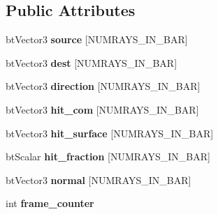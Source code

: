 \subsection*{Public Attributes}
\begin{DoxyCompactItemize}
\item 
\hypertarget{classbt_convexcast_batch_af49961c9228ece1ae5c6c7099a54441c}{bt\+Vector3 {\bfseries source} \mbox{[}N\+U\+M\+R\+A\+Y\+S\+\_\+\+I\+N\+\_\+\+B\+A\+R\mbox{]}}\label{classbt_convexcast_batch_af49961c9228ece1ae5c6c7099a54441c}

\item 
\hypertarget{classbt_convexcast_batch_a318654732e77f21596438f67617095ab}{bt\+Vector3 {\bfseries dest} \mbox{[}N\+U\+M\+R\+A\+Y\+S\+\_\+\+I\+N\+\_\+\+B\+A\+R\mbox{]}}\label{classbt_convexcast_batch_a318654732e77f21596438f67617095ab}

\item 
\hypertarget{classbt_convexcast_batch_a8bb4742eeca2f7eb9d22002be1f7f445}{bt\+Vector3 {\bfseries direction} \mbox{[}N\+U\+M\+R\+A\+Y\+S\+\_\+\+I\+N\+\_\+\+B\+A\+R\mbox{]}}\label{classbt_convexcast_batch_a8bb4742eeca2f7eb9d22002be1f7f445}

\item 
\hypertarget{classbt_convexcast_batch_abd524e5a612687deda8346b94b6d120a}{bt\+Vector3 {\bfseries hit\+\_\+com} \mbox{[}N\+U\+M\+R\+A\+Y\+S\+\_\+\+I\+N\+\_\+\+B\+A\+R\mbox{]}}\label{classbt_convexcast_batch_abd524e5a612687deda8346b94b6d120a}

\item 
\hypertarget{classbt_convexcast_batch_a0e78c6f2ccb9cf8f3f51a1791af815ec}{bt\+Vector3 {\bfseries hit\+\_\+surface} \mbox{[}N\+U\+M\+R\+A\+Y\+S\+\_\+\+I\+N\+\_\+\+B\+A\+R\mbox{]}}\label{classbt_convexcast_batch_a0e78c6f2ccb9cf8f3f51a1791af815ec}

\item 
\hypertarget{classbt_convexcast_batch_ad4bc269902bba4549e29cd2c586925f8}{bt\+Scalar {\bfseries hit\+\_\+fraction} \mbox{[}N\+U\+M\+R\+A\+Y\+S\+\_\+\+I\+N\+\_\+\+B\+A\+R\mbox{]}}\label{classbt_convexcast_batch_ad4bc269902bba4549e29cd2c586925f8}

\item 
\hypertarget{classbt_convexcast_batch_a49d67449d52e97212805c5ea8818d5c4}{bt\+Vector3 {\bfseries normal} \mbox{[}N\+U\+M\+R\+A\+Y\+S\+\_\+\+I\+N\+\_\+\+B\+A\+R\mbox{]}}\label{classbt_convexcast_batch_a49d67449d52e97212805c5ea8818d5c4}

\item 
\hypertarget{classbt_convexcast_batch_aafec1dc282b0ae5932ac6a40e9f5efee}{int {\bfseries frame\+\_\+counter}}\label{classbt_convexcast_batch_aafec1dc282b0ae5932ac6a40e9f5efee}


\end{DoxyCompactItemize}
